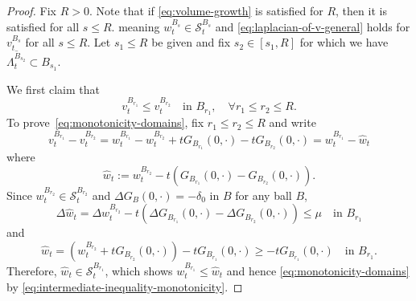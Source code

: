 \documentclass[12pt]{amsart}
\numberwithin{equation}{section}
\newcommand{\mclS}[2]{\hyperref[eq:super-solutions]{\mathcal{S}^{#1}_{#2}}}
\newcommand{\lss}[2]{\hyperref[eq:least-super-solution]{w^{#1}_{#2}}}
\newcommand{\cluster}[2]{\hyperref[eq:non-co-set]{\mathit{\Lambda}^{#1}_{#2}}}
\newcommand{\odometer}[2]{\hyperref[eq:limit-odometer]{v^{#1}_{#2}}}
\begin{document}
	\begin{proof}
		Fix $R > 0$. Note that if \eqref{eq:volume-growth} is satisfied for $R$, then it is satisfied for all $s \leq R$.
		meaning $\lss{B_s}{t} \in \mclS{B_s}{t}$ and \eqref{eq:laplacian-of-v-general} holds for $\odometer{B_s}{t}$ for all $s \leq R$.  Let $s_1 \leq R$ be given and fix $s_2 \in [s_1, R]$ for which we have $\overline{\cluster{B_{s_2}}{t}} \subset B_{s_1}$.
		
		We first claim that
		\begin{equation} \label{eq:monotonicity-domains}
		\odometer{B_{r_1}}{t} \leq \odometer{B_{r_2}}{t} \quad \mbox{in $B_{r_1}$}, \quad \forall r_1 \leq r_2 \leq R.
		\end{equation}
		To prove~\eqref{eq:monotonicity-domains}, fix $r_1 \leq r_2 \leq R$ and write
		\begin{equation} \label{eq:intermediate-inequality-monotonicity}
		\odometer{B_{r_1}}{t} - \odometer{B_{r_2}}{t} =  \lss{B_{r_1}}{t} -  \lss{B_{r_2}}{t} + t G_{B_{r_1}}(0,\cdot) - t G_{B_{r_2}}(0,\cdot) = \lss{B_{r_1}}{t} - \hat{w}_t
		\end{equation}
		where
		\begin{equation}
		\hat{w}_t := \lss{B_{r_2}}{t} - t (G_{B_{r_1}}(0,\cdot) - G_{B_{r_2}}(0,\cdot))  .
		\end{equation}
		Since $\lss{B_{r_2}}{t} \in \mclS{B_{r_2}}{t}$ and $\Delta G_{B}(0,\cdot) = -\delta_0$ in $B$ for any ball $B$, 
		\begin{equation}
		\Delta \hat{w}_t = \Delta \lss{B_{r_2}}{t} - t (\Delta G_{B_{r_1}}(0,\cdot) - \Delta G_{B_{r_2}}(0,\cdot)) \leq \mu  \quad \mbox{in $B_{r_1}$}
		\end{equation}
		and 
		\begin{equation}
		\hat{w}_t = (\lss{B_{r_2}}{t}  + t G_{B_{r_2}}(0,\cdot)) - t G_{B_{r_1}}(0,\cdot)  \geq - t G_{B_{r_1}}(0,\cdot) \quad \mbox{in $B_{r_1}$}.
		\end{equation}
		Therefore, $\hat{w}_t \in \mclS{B_{r_1}}{t}$, which shows $\lss{B_{r_1}}{t} \leq \hat{w}_t$ and hence \eqref{eq:monotonicity-domains} by \eqref{eq:intermediate-inequality-monotonicity}.
		

\end{proof}
\end{document}
